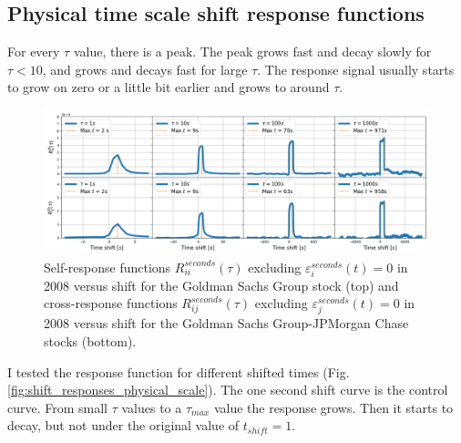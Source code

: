 \subsection{Physical time scale shift response functions}
\label{subsec:time_shift_physical}

For every $\tau$ value, there is a peak. The peak grows fast and decay slowly
for $\tau < 10$, and grows and decays fast for large $\tau$. The response
signal usually starts to grow on zero or a little bit earlier and grows to
around $\tau$.

\begin{figure}[htbp]
    \centering
    \includegraphics[width=\textwidth]{figures/04_shift_physical.png}
    \caption{Self-response functions $R_{ii}^{seconds}\left(\tau\right)$
             excluding $\varepsilon^{seconds}_{i}\left(t\right) = 0$ in 2008
             versus shift for the Goldman Sachs Group stock (top) and
             cross-response functions $R_{ij}^{seconds}\left(\tau\right)$
             excluding $\varepsilon^{seconds}_{j}\left(t\right) = 0$ in 2008
             versus shift for the Goldman Sachs Group-JPMorgan Chase stocks
             (bottom).}
    \label{fig:shift_physical_scale}
\end{figure}

I tested the response function for different shifted times (Fig.
\ref{fig:shift_responses_physical_scale}). The one second shift curve is the control curve. From small
$\tau$ values to a $\tau_{max}$ value the response grows. Then it starts to decay, but not under the
original value of $t_{shift} = 1$.

